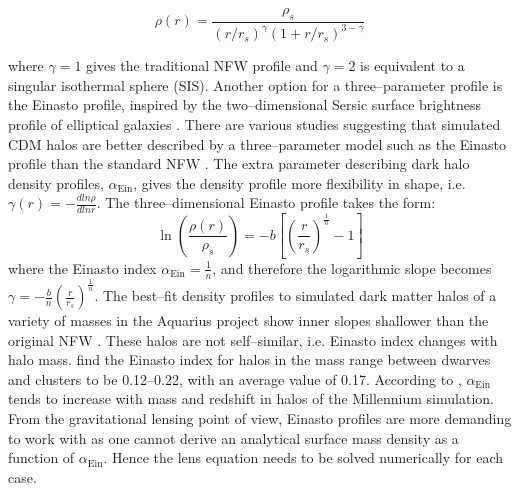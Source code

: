 \documentclass[a4wide,12pt]{book}
\begin{document}
{\begin{equation}
\rho(r) = \frac{\rho_s}{(r / r_s)^\gamma(1 + r/r_s)^{3-\gamma}}
\end{equation}

where $\gamma = 1$ gives the traditional NFW profile and $\gamma = 2$ is equivalent to a singular isothermal sphere (SIS). Another option for a three--parameter profile is the Einasto profile, inspired by the two--dimensional Sersic surface brightness profile of elliptical galaxies \citep[][]{Einasto1965}. There are various studies suggesting that simulated CDM halos are better described by a three--parameter model such as the Einasto profile than the standard NFW \citep[e.g.][]{Navarro+2004, Gao+2008, DiCintio+2014, Dutton.Maccio2014}. The extra parameter describing dark halo density profiles, $\alpha_\mathrm{Ein}$, gives the density profile more flexibility in shape, i.e. $\gamma(r)=-\frac{dln\rho}{dlnr}$. The three--dimensional Einasto profile takes the form:
\begin{equation}
\ln\left(\frac{\rho(r)}{\rho_s}\right) = -b\left[\left(\frac{r}{r_s}\right)^{\frac{1}{n}} - 1\right]
\end{equation}
where the Einasto index $\alpha_\mathrm{Ein} = \frac{1}{n}$, and therefore the logarithmic slope becomes $\gamma = -\frac{b}{n}(\frac{r}{r_s})^\frac{1}{n}$. The best--fit density profiles to simulated dark matter halos of a variety of masses in the Aquarius project show inner slopes shallower than the original NFW \citep{Navarro+2010}. These halos are not self--similar, i.e. Einasto index changes with halo mass. \citet{Navarro+2004} find the Einasto index for halos in the mass range between dwarves and clusters to be 0.12--0.22, with an average value of 0.17. According to \citet{Hayashi.White2008, Gao+2008}, $\alpha_\mathrm{Ein}$ tends to increase with mass and redshift in halos of the Millennium simulation. From the gravitational lensing point of view, Einasto profiles are more demanding to work with as one cannot derive an analytical surface mass density as a function of $\alpha_\mathrm{Ein}$. Hence the lens equation needs to be solved numerically for each case.

}
\end{document}
